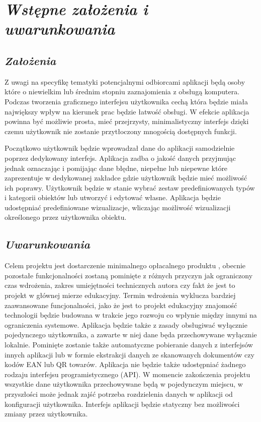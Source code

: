 \documentclass[a4paper,10pt]{report}
\newcommand{\customstylechapter}[1]{\large{\textit{#1}}}
\newcommand{\customstylesection}[1]{\textbf{\textit{#1}}}
\begin{document}
\chapter{\customstylechapter{Wstępne założenia i uwarunkowania}}
\section{\customstylesection{Założenia}}
{Z uwagi na specyfikę tematyki potencjalnymi odbiorcami aplikacji będą osoby 
które o niewielkim lub średnim stopniu zaznajomienia z obsługą komputera. 
Podczas tworzenia graficznego interfejsu użytkownika cechą która będzie miała 
największy wpływ na kierunek prac będzie łatwość obsługi. W efekcie aplikacja 
powinna być możliwie prosta, mieć przejrzysty, minimalistyczny interfejs dzięki 
czemu użytkownik nie zostanie przytłoczony mnogością dostępnych funkcji.}

{Początkowo użytkownik będzie wprowadzał dane do aplikacji samodzielnie poprzez 
dedykowany interfejs. Aplikacja zadba o jakość danych przyjmując jednak 
oznaczając i pomijając dane błędne, niepełne lub niepewne które zaprezentuje w 
dedykowanej zakładce gdzie użytkownik będzie mieć możliwość ich poprawy. 
Użytkownik będzie w stanie wybrać zestaw predefiniowanych typów i kategorii 
obiektów lub utworzyć i edytować własne. Aplikacja będzie udostępniać 
predefiniowane wizualizacje, wliczając możliwość wizualizacji określonego 
przez użytkownika obiektu.}

\section{\customstylesection{Uwarunkowania}}
{Celem projektu jest dostarczenie minimalnego opłacalnego produktu \cite{MVP}, 
obecnie pozostałe funkcjonalności zostaną pominięte z różnych przyczyn jak 
ograniczony czas wdrożenia, zakres umiejętności technicznych autora czy fakt że 
jest to projekt w głównej mierze edukacyjny. Termin wdrożenia wyklucza bardziej 
zaawansowane funcjonalności, jako że jest to projekt edukacyjny znajomość 
technologii będzie budowana w trakcie jego rozwoju co wpłynie między innymi na 
ograniczenia systemowe. Aplikacja będzie także z zasady obsługiwać wyłącznie 
pojedynczego użytkownika, a zawarte w niej dane będa  przechowywane wyłącznie 
lokalnie. Pominięte zostanie także automatyczne pobieranie danych z interfejsów 
innych aplikacji lub w formie ekstrakcji danych ze skanowanych dokumentów czy 
kodów EAN lub QR towarów. Aplikacja nie będzie także udostępniać żadnego rodzaju
 interfejsu programistycznego (API). W momencie zakończenia projektu wszystkie 
dane użytkownika przechowywane będą w pojedynczym miejscu, w przyszłości może 
jednak zajść potrzeba rozdzielenia danych w aplikacji od konfiguracji 
użytkownika. Interfejs aplikacji będzie statyczny bez możliwości zmiany przez 
użytkownika.}
\end{document}
